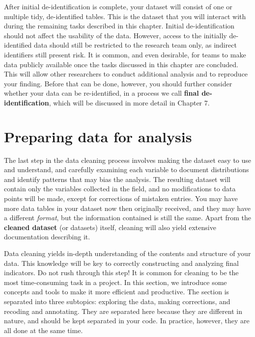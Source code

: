After initial de-identification is complete, 
your dataset will consist of one or multiple tidy, 
de-identified tables.
This is the dataset that you will interact with 
during the remaining tasks described in this chapter.
Initial de-identification should not affect the usability of the data.
However, access to the initially de-identified data 
should still be restricted to the research team only,
as indirect identifiers still present risk.
It is common, and even desirable, for teams to make data publicly available
once the tasks discussed in this chapter are concluded.
This will allow other researchers to conduct additional analysis and to reproduce your finding.
Before that can be done, however,
you should further consider whether your data can be re-identified,
in a process we call \textbf{final de-identification},
which will be discussed in more detail in Chapter 7.


\section{Preparing data for analysis}

The last step in the data cleaning process involves
making the dataset easy to use and understand, and 
carefully examining each variable to document distributions 
and identify patterns that may bias the analysis.
The resulting dataset will contain only the variables collected in the field, and
no modifications to data points will be made, 
except for corrections of mistaken entries.
You may have more data tables in your dataset now then originally received,
and they may have a different \textit{format},
but the information contained is still the same.
Apart from the \textbf{cleaned dataset} (or datasets) itself,
cleaning will also yield extensive documentation describing it.

Data cleaning yields in-depth understanding of the contents and structure of your data.
This knowledge will be key to correctly constructing and analyzing final indicators.
Do not rush through this step!
It is common for cleaning to be the most time-consuming task in a project.
In this section, we introduce some concepts and tools to make it more efficient and productive.
The section is separated into three subtopics:
exploring the data, making corrections, and recoding and annotating.
They are separated here because they are different in nature,
and should be kept separated in your code.
In practice, however, they are all done at the same time.



